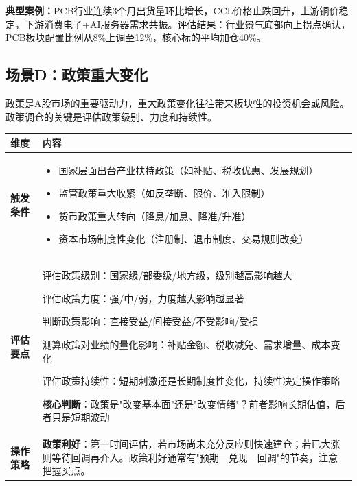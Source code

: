 \begin{exhibitbox}[表9-19：行业景气度拐点调仓指南]
\textbf{典型案例：}PCB行业连续3个月出货量环比增长，CCL价格止跌回升，上游铜价稳定，下游消费电子+AI服务器需求共振。评估结果：行业景气底部向上拐点确认，PCB板块配置比例从8\%上调至12\%，核心标的平均加仓40\%。
\end{exhibitbox}

\subsection{场景D：政策重大变化}

政策是A股市场的重要驱动力，重大政策变化往往带来板块性的投资机会或风险。政策调仓的关键是评估政策级别、力度和持续性。

\begin{exhibitbox}[表9-20：政策重大变化调仓指南]
\scriptsize
\setlength{\tabcolsep}{3pt}
\renewcommand{\arraystretch}{1.12}
\begin{tabularx}{\textwidth}{l X}
\toprule
\textbf{维度} & \textbf{内容} \\
\midrule
\textbf{触发条件} & 
\begin{itemize}[leftmargin=1.2em]
\item 国家层面出台产业扶持政策（如补贴、税收优惠、发展规划）
\item 监管政策重大收紧（如反垄断、限价、准入限制）
\item 货币政策重大转向（降息/加息、降准/升准）
\item 资本市场制度性变化（注册制、退市制度、交易规则改变）
\end{itemize}
\\
\midrule
\textbf{评估要点} & 
评估政策级别：国家级/部委级/地方级，级别越高影响越大

评估政策力度：强/中/弱，力度越大影响越显著

判断政策影响：直接受益/间接受益/不受影响/受损

测算政策对业绩的量化影响：补贴金额、税收减免、需求增量、成本变化

评估政策持续性：短期刺激还是长期制度性变化，持续性决定操作策略

\textbf{核心判断}：政策是"改变基本面"还是"改变情绪"？前者影响长期估值，后者只是短期波动
\\
\midrule
\textbf{操作策略} & 
\textbf{政策利好}：第一时间评估，若市场尚未充分反应则快速建仓；若已大涨则等待回调再介入。政策利好通常有"预期—兑现—回调"的节奏，注意把握买点。


\end{tabularx}
\end{exhibitbox}
